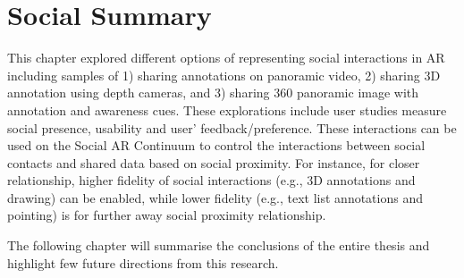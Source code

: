 \section{Social Summary}

This chapter explored different options of representing social interactions in AR including samples of 1) sharing annotations on panoramic video, 2) sharing 3D annotation using depth cameras, and 3) sharing 360 panoramic image with annotation and awareness cues. These explorations include user studies measure social presence, usability and user' feedback/preference. These interactions can be used on the Social AR Continuum to control the interactions between social contacts and shared data based on social proximity. For instance, for closer relationship, higher fidelity of social interactions (e.g., 3D annotations and drawing) can be enabled, while lower fidelity (e.g., text list annotations and pointing) is for further away social proximity relationship.

The following chapter will summarise the conclusions of the entire thesis and highlight few future directions from this research.
